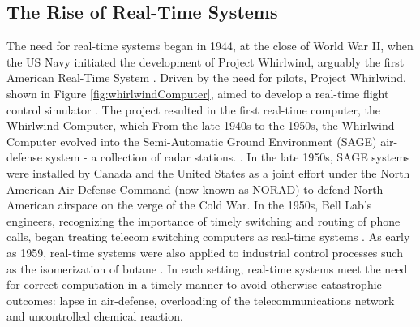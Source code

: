 \subsection{The Rise of Real-Time Systems}


The need for real-time systems began in 1944, at the close of World War II, when the US Navy initiated the development of Project Whirlwind, arguably the first American Real-Time System \cite{laplante_historical_1995}.
Driven by the need for pilots, Project Whirlwind, shown in Figure \ref{fig:whirlwindComputer}, aimed to develop a real-time flight control simulator \cite{forrester_whirlwind_1990}.
The project resulted in the first real-time computer, the Whirlwind Computer, which 
From the late 1940s to the 1950s, the Whirlwind Computer evolved into the Semi-Automatic Ground Environment (SAGE) air-defense system - a collection of radar stations. \cite{noauthor_tales_nodate}.
In the late 1950s, SAGE systems were installed by Canada and the United States as a joint effort under the North American Air Defense Command (now known as NORAD) to defend North American airspace on the verge of the Cold War\cite{lacomia_brief_nodate}.
In the 1950s, Bell Lab's engineers, recognizing the importance of timely switching and routing of phone calls, began treating telecom switching computers as real-time systems \cite{joel_communication_1957}.
As early as 1959, real-time systems were also applied to industrial control processes such as the isomerization of butane \cite{harrison_evolution_1981-1,stout_computer_1959}.
In each setting, real-time systems meet the need for correct computation in a timely manner to avoid otherwise catastrophic outcomes: lapse in air-defense, overloading of the telecommunications network and uncontrolled chemical reaction.

